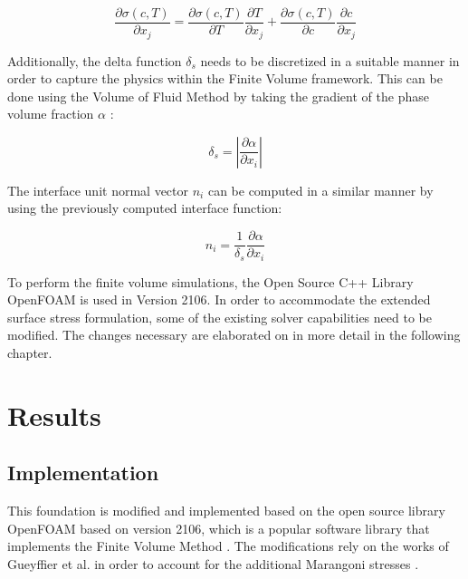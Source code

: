 \documentclass[conference,final]{IEEEtran}
\begin{document}
\begin{equation}
    \frac{\partial \sigma(c,T)}{\partial x_j} = \frac{\partial \sigma(c,T)}{\partial T} \frac{\partial T}{\partial x_j} + \frac{\partial \sigma(c,T)}{\partial c} \frac{\partial c}{\partial x_j}
    \label{eq:sigmadiff}
\end{equation}

Additionally, the delta function $\delta_s$ needs to be discretized in a suitable manner in order to capture the physics within the Finite Volume framework. This can be done using the Volume of Fluid Method by taking the gradient of the phase volume fraction $\alpha$ \cite{gueyffierVolumeofFluidInterfaceTracking1999,hirtVolumeFluidVOF1981}:

\begin{equation}
    \delta_s = \left\lvert \frac{\partial \alpha}{\partial x_i} \right\rvert
\end{equation}

The interface unit normal vector $n_i$ can be computed in a similar manner by using the previously computed interface function:

\begin{equation}
    n_i = \frac{1}{\delta_s} \frac{\partial \alpha}{\partial x_i}
\end{equation}

To perform the finite volume simulations, the Open Source C++ Library OpenFOAM is used in Version 2106. In order to accommodate the extended surface stress formulation, some of the existing solver capabilities need to be modified. The changes necessary are elaborated on in more detail in the following chapter.

\section{Results}

\subsection{Implementation}

This foundation is modified and implemented based on the open source library OpenFOAM based on version 2106, which is a popular software library that implements the Finite Volume Method \cite{jasakOpenFOAMLibraryComplex2007}. The modifications rely on the works of Gueyffier et al. in order to account for the additional Marangoni stresses \cite{gueyffierVolumeofFluidInterfaceTracking1999}.
\end{document}
